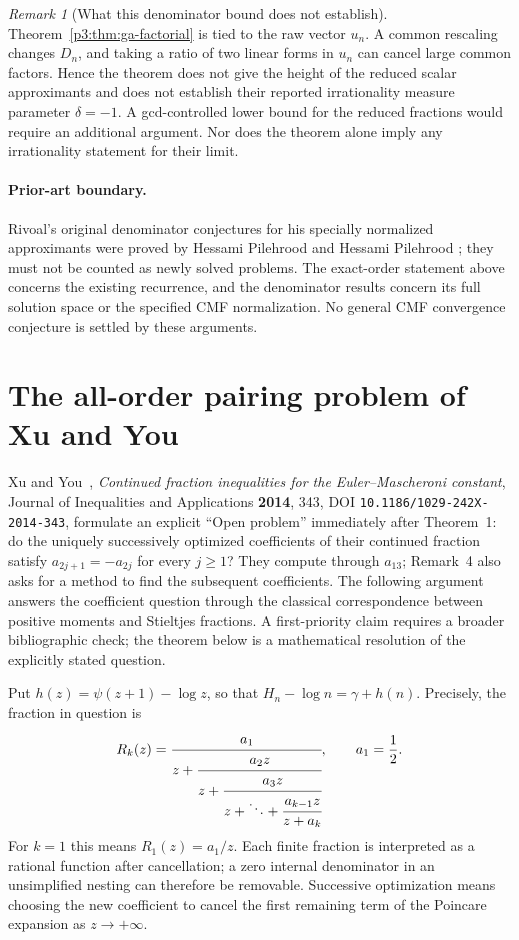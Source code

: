 \documentclass[11pt,a4paper]{article}
\theoremstyle{definition}
\theoremstyle{remark}
\newtheorem{remark}[theorem]{Remark}
\numberwithin{equation}{section}
\begin{document}
\begin{remark}[What this denominator bound does not establish]
Theorem~\ref{p3:thm:ga-factorial} is tied to the raw vector $u_n$.
A common rescaling changes $D_n$, and taking a ratio of two linear
forms in $u_n$ can cancel large common factors. Hence the theorem
does not give the height of the reduced scalar approximants and
does not establish their reported irrationality measure parameter
$\delta=-1$. A gcd-controlled lower bound for the reduced fractions
would require an additional argument. Nor does the theorem alone
imply any irrationality statement for their limit.
\end{remark}

\paragraph{Prior-art boundary.}
Rivoal's original denominator conjectures for his specially normalized
approximants were proved by Hessami Pilehrood and Hessami Pilehrood
\cite{p3:HHP11}; they must not be counted as newly solved problems.
The exact-order statement above concerns the existing recurrence,
and the denominator results concern its full solution space or the
specified CMF normalization. No general CMF convergence conjecture
is settled by these arguments.


\section{The all-order pairing problem of Xu and You}
\label{p3:sec:xu-you-pairing}

Xu and You~\cite{p3:XuYou2014}, \emph{Continued fraction inequalities for the
Euler--Mascheroni constant}, Journal of Inequalities and Applications
\textbf{2014}, 343, DOI \texttt{10.1186/1029-242X-2014-343}, formulate an
explicit ``Open problem'' immediately after Theorem~1: do the uniquely
successively optimized coefficients of their continued fraction satisfy
$a_{2j+1}=-a_{2j}$ for every $j\geq1$?  They compute through $a_{13}$;
Remark~4 also asks for a method to find the subsequent coefficients.
The following argument answers the coefficient question through the
classical correspondence between positive moments and Stieltjes fractions.
A first-priority claim requires a broader bibliographic check; the theorem
below is a mathematical resolution of the explicitly stated question.

Put $h(z)=\psi(z+1)-\log z$, so that
$H_n-\log n=\gamma+h(n)$.  Precisely, the fraction in question is
\[
 R_k(z)=\cfrac{a_1}{z+\cfrac{a_2z}{z+\cfrac{a_3z}{
 z+\ddots+\cfrac{a_{k-1}z}{z+a_k}}}},\qquad a_1=\frac12.
\]
For $k=1$ this means $R_1(z)=a_1/z$. Each finite fraction is interpreted
as a rational function after cancellation; a zero internal denominator
in an unsimplified nesting can therefore be removable. Successive optimization means
choosing the new coefficient to cancel the first remaining term of the
Poincare expansion as $z\to+\infty$.
\end{document}
